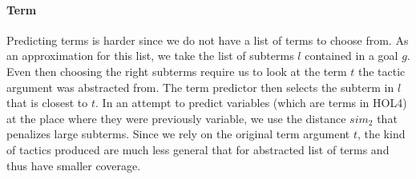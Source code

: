 \documentclass[runningheads,a4paper,draft]{svjour3}
\def\holfour{\textsf{HOL4}\xspace}
\begin{document}
\paragraph{Term}
Predicting terms is harder since we do not have a list of terms to choose from.
As an approximation for this list, we take the list of subterms $l$ contained 
in a goal $g$. Even then choosing the right subterms require us to look at the 
term $t$ the tactic argument was abstracted from. The term predictor then 
selects the subterm in $l$ that is closest to $t$. In an attempt to predict 
variables (which are terms in \holfour) at the place where they were previously 
variable, we use the distance $sim_2$ that penalizes large subterms.
Since we rely on the original term argument $t$, the kind of tactics produced 
are much less general that for abstracted list of terms and thus have smaller
coverage.





%
%
%
%
%
%
%
%
%
%
\end{document}
